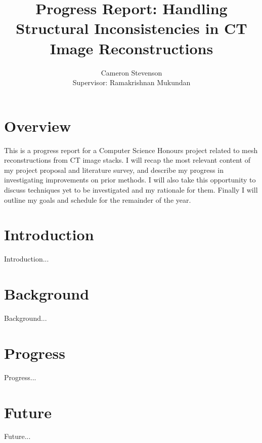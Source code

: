 \documentclass[12pt]{article}
\title{Progress Report: Handling Structural Inconsistencies in CT Image Reconstructions}
\author{Cameron Stevenson\\[1cm]{\small Supervisor: Ramakrishnan Mukundan}}
\begin{document}
\maketitle

\section{Overview}

This is a progress report for a Computer Science Honours project related to mesh reconstructions from CT image stacks. I will recap the most relevant content of my project proposal and literature survey, and describe my progress in investigating improvements on prior methods. I will also take this opportunity to discuss techniques yet to be investigated and my rationale for them. Finally I will outline my goals and schedule for the remainder of the year.

\section{Introduction}

Introduction...

\section{Background}

Background...

\section{Progress}

Progress...

\section{Future}

Future...

\pagebreak


\end{document}
